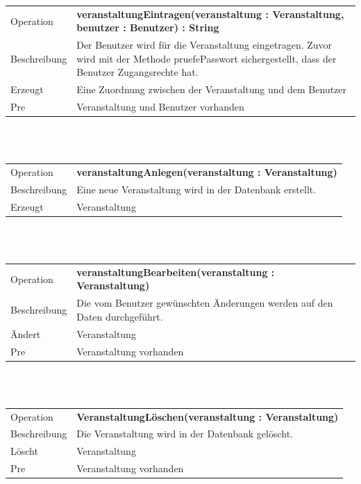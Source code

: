 \documentclass[12pt,a4paper]{article}
\begin{document}
{\begin{tabular}{|l|p{12cm}|}
	\hline
	Operation &  \textbf{veranstaltungEintragen(veranstaltung : Veranstaltung, benutzer : Benutzer) : String} \\ 
	Beschreibung &  Der Benutzer wird für die Veranstaltung eingetragen. Zuvor wird mit der Methode pruefePasswort sichergestellt, dass der Benutzer Zugangsrechte hat.\\ 
	Erzeugt &  Eine Zuordnung zwischen der Veranstaltung und dem Benutzer \\ 
	Pre & Veranstaltung und Benutzer vorhanden \\ 
	\hline 
\end{tabular}\\\\

\begin{tabular}{|l|p{12cm}|}
	\hline
	Operation &  \textbf{veranstaltungAnlegen(veranstaltung : Veranstaltung) }\\ 
	Beschreibung &  Eine neue Veranstaltung wird in der Datenbank erstellt.\\ 
	Erzeugt &  Veranstaltung \\ 
	\hline 
\end{tabular}\\\\

\begin{tabular}{|l|p{12cm}|}
	\hline
	Operation &  \textbf{veranstaltungBearbeiten(veranstaltung : Veranstaltung)} \\ 
	Beschreibung &  Die vom Benutzer gewünschten Änderungen werden auf den Daten durchgeführt.\\ 
	Ändert &  Veranstaltung\\ 
	Pre &  Veranstaltung vorhanden\\ 
	\hline 
\end{tabular}\\\\

\begin{tabular}{|l|p{12cm}|}
	\hline
	Operation & \textbf{ VeranstaltungLöschen(veranstaltung : Veranstaltung)} \\ 
	Beschreibung &  Die Veranstaltung wird in der Datenbank gelöscht.\\ 
	Löscht &  Veranstaltung\\ 
	Pre &  Veranstaltung vorhanden\\ 
	\hline 
\end{tabular}\\\\

}
\end{document}

